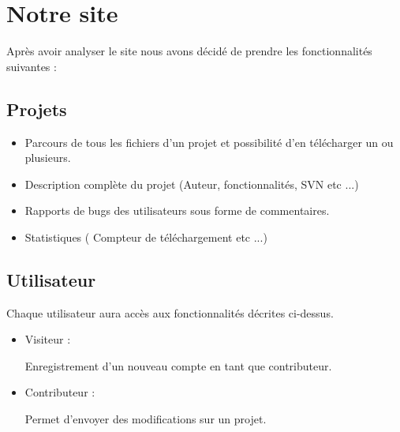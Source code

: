 \documentclass[a4paper,12pt]{article}
\begin{document}
\vskip5mm

\section{Notre site}
Après avoir analyser le site nous avons décidé de prendre les fonctionnalités suivantes :

\subsection{Projets}

\begin{itemize}

\item Parcours de tous les fichiers d'un projet et possibilité d'en télécharger un ou plusieurs.
\item Description complète du projet (Auteur, fonctionnalités, SVN etc ...)
\item Rapports de bugs des utilisateurs sous forme de commentaires.
\item Statistiques ( Compteur de téléchargement etc ...) 

\end{itemize}

\subsection{Utilisateur}

Chaque utilisateur aura accès aux fonctionnalités décrites ci-dessus.

\vskip5mm

\begin{itemize}

\item Visiteur :

\vskip3mm

\subitem\textbullet{} Enregistrement d'un nouveau compte en tant que contributeur.

\vskip3mm

\item Contributeur :

\vskip3mm

\subitem\textbullet{} Permet d'envoyer des modifications sur un projet.

\end{itemize}
\end{document}
